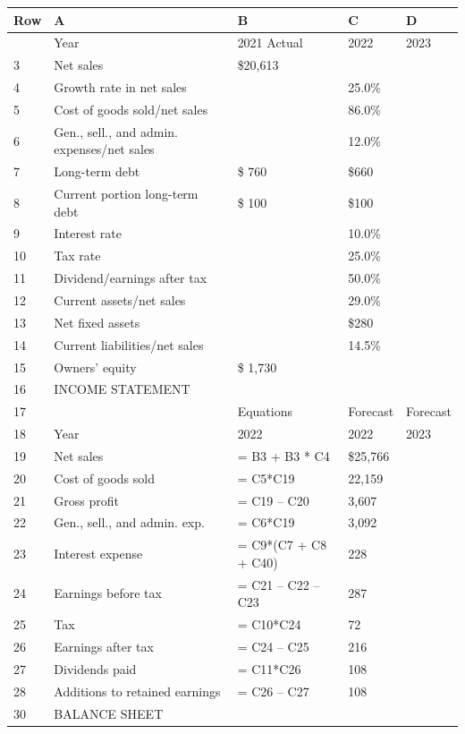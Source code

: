 \documentclass[11pt,a4paper]{article}
\begin{document}
{\def\LTcaptype{none} %
\begin{longtable}[]{@{}lllll@{}}
\toprule\noalign{}
Row & A & B & C & D \\
\midrule\noalign{}
\endhead
\bottomrule\noalign{}
\endlastfoot
2 & Year & 2021 Actual & 2022 & 2023 \\
3 & Net sales & \$20,613 & & \\
4 & Growth rate in net sales & & 25.0\% & \\
5 & Cost of goods sold/net sales & & 86.0\% & \\
6 & Gen., sell., and admin. expenses/net sales & & 12.0\% & \\
7 & Long-term debt & \$ 760 & \$660 & \\
8 & Current portion long-term debt & \$ 100 & \$100 & \\
9 & Interest rate & & 10.0\% & \\
10 & Tax rate & & 25.0\% & \\
11 & Dividend/earnings after tax & & 50.0\% & \\
12 & Current assets/net sales & & 29.0\% & \\
13 & Net fixed assets & & \$280 & \\
14 & Current liabilities/net sales & & 14.5\% & \\
15 & Owners' equity & \$ 1,730 & & \\
16 & INCOME STATEMENT & & & \\
17 & & Equations & Forecast & Forecast \\
18 & Year & 2022 & 2022 & 2023 \\
19 & Net sales & = B3 + B3 * C4 & \$25,766 & \\
20 & Cost of goods sold & = C5*C19 & 22,159 & \\
21 & Gross profit & = C19 -- C20 & 3,607 & \\
22 & Gen., sell., and admin. exp. & = C6*C19 & 3,092 & \\
23 & Interest expense & = C9*(C7 + C8 + C40) & 228 & \\
24 & Earnings before tax & = C21 -- C22 -- C23 & 287 & \\
25 & Tax & = C10*C24 & 72 & \\
26 & Earnings after tax & = C24 -- C25 & 216 & \\
27 & Dividends paid & = C11*C26 & 108 & \\
28 & Additions to retained earnings & = C26 -- C27 & 108 & \\
30 & BALANCE SHEET & & & \\

\end{longtable}}
\end{document}
